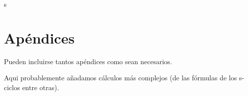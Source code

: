 s\chapter{Apéndices}
Pueden incluirse tantos apéndices como sean necesarios.


Aqui probablemente añadamos cálculos más complejos (de las fórmulas de los s-ciclos entre otras).